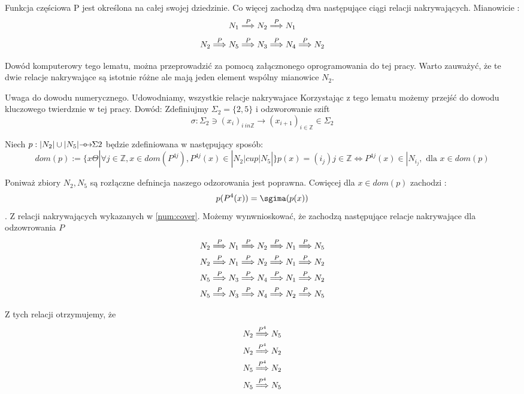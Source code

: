 \begin{lemma}
\label{num:cov}
 Funkcja częściowa P jest określona na całej swojej dziedzinie.
 Co więcej zachodzą dwa następujące ciągi relacji nakrywających. Mianowicie :
 $$
    N_1 \stackrel{P}{\Longrightarrow} N_2 \stackrel{P}{\Longrightarrow} N_1
 $$
 $$
    N_2 \stackrel{P}{\Longrightarrow} N_5 \stackrel{P}{\Longrightarrow} N_3 \stackrel{P}{\Longrightarrow} N_4 \stackrel{P}{\Longrightarrow} N_2 
 $$
 
 Dowód komputerowy tego lematu, można przeprowadzić za pomocą załącznonego oprogramowania do tej pracy.
 Warto zauważyć, że te dwie relacje nakrywające są istotnie różne ale mają jeden element wspólny mianowice $ N_2 $.
 

\end{lemma}
Uwaga do dowodu numerycznego. Udowodniamy, wszystkie relacje nakrywajace 
Korzystając z tego lematu możemy przejść do dowodu kluczowego twierdznie w tej pracy.
Dowód:
Zdefiniujmy $ \Sigma_2 = \{ 2,5 \} $ i odzworowanie szift 
$$
  \sigma : \Sigma_2 \ni (x_i)_{i \ in \mathbb Z} \to (x_{i+1})_{i \in \mathbb Z } \in \Sigma_2
$$

Niech $ p : | N_2 | \cup | N_5 | \oarrow \Sigma2 $ będzie zdefiniowana w następujący sposób:
$$
  dom (p) := \{ x \Theta | \forall j \in \mathbb Z, x \in dom(P^{4j}), P^{4j}(x) \in |N_2| cup |N_5| \}
 
  p(x) = (i_j) j \in \mathbb Z \Leftrightarrow P^{4j}(x) \in |N_{i_j}, \text{ dla } x \in dom(p)
$$

Poniważ zbiory $ N_2, N_5 $ są rozłączne defnincja naszego odzorowania jest poprawna. Cowięcej dla $ x \in dom(p) $ zachodzi :
$$
  p(P^4(x)) = \sgima(p(x))
$$
.
Z relacji nakrywających wykazanych w \ref{num:cover}. Możemy wynwnioskować, że zachodzą następujące relacje nakrywające dla odzowrowania $ P $
\begin{eqnarray}


  N_2 \cover{P} N_1 \cover{P} N_2 \cover{P} N_1 \cover{P} N_5 \\
 
  N_2 \cover{P} N_1 \cover{P} N_2 \cover{P} N_1 \cover{P} N_2 \\
  
  N_5 \cover{P} N_3 \cover{P} N_4 \cover{P} N_1 \cover{P} N_2 \\
  
  N_5 \cover{P} N_3 \cover{P} N_4 \cover{P} N_2 \cover{P} N_5 
  \end{eqnarray}

  Z tych relacji otrzymujemy, że 
\begin{eqnarray}
  N_2 \stackrel{ P^4 }{\Longrightarrow} N_5 \\
  N_2 \stackrel{ P^4 }{\Longrightarrow} N_2 \\
  N_5 \stackrel{ P^4 }{\Longrightarrow} N_2 \\
  N_5 \stackrel{ P^4 }{\Longrightarrow} N_5 \\
\end{eqnarray}

